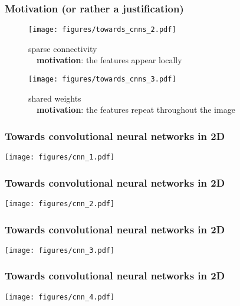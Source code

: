 \documentclass[notes]{beamer}          %
\begin{document}
\begin{frame}
\frametitle{Motivation (or rather a justification)}
\begin{figure}[ht]
        \begin{minipage}[b]{0.45\linewidth}
            \centering
            \texttt{[image: figures/towards\_cnns\_2.pdf]}
            
            \small{sparse connectivity\\~\
            \textbf{motivation}: the features appear locally}
        \end{minipage}
        \hspace{0.1cm}
        \begin{minipage}[b]{0.45\linewidth}
            \centering
            \texttt{[image: figures/towards\_cnns\_3.pdf]}
            
            \small{shared weights\\~\
            \textbf{motivation}: the features repeat throughout the image}
        \end{minipage}
 \end{figure}
\end{frame}

\begin{frame}
\frametitle{Towards convolutional neural networks in 2D}
\begin{center}
\texttt{[image: figures/cnn\_1.pdf]} \\
\end{center}
\end{frame}

\begin{frame}
\frametitle{Towards convolutional neural networks in 2D}
\begin{center}
\texttt{[image: figures/cnn\_2.pdf]} \\
\end{center}
\end{frame}

\begin{frame}
\frametitle{Towards convolutional neural networks in 2D}
\begin{center}
\texttt{[image: figures/cnn\_3.pdf]} \\
\end{center}
\end{frame}

\begin{frame}
\frametitle{Towards convolutional neural networks in 2D}
\begin{center}
\texttt{[image: figures/cnn\_4.pdf]} \\
\end{center}
\end{frame}
\end{document}
